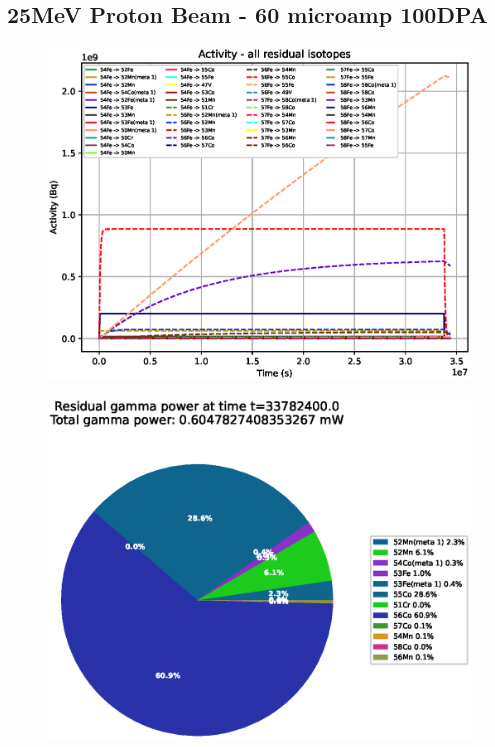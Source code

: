 \clearpage
\FloatBarrier
\subsection{25MeV Proton Beam - 60 microamp 100DPA}

\begin{figure}[!htb]
\centering
\includegraphics[width=0.7\linewidth]{chapters/activity_code/fe_100dpa/by_isotope/25MeV_all_radioactive_isotopes.eps}
\caption{}
\label{fig:5mev-proton-100dpa-activity}
\end{figure}

\begin{figure}[!htb]
\centering
\includegraphics[width=0.7\linewidth]{chapters/activity_code/fe_100dpa/endofbeam/25MeV_0400_33782400.eps}
\caption{}
\label{fig:5mev-proton-100dpa}
\end{figure}

